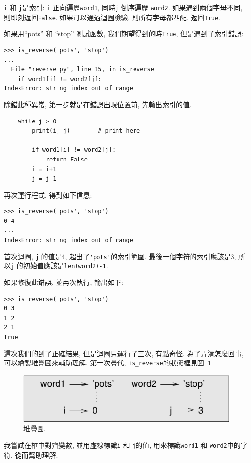 \documentclass[10pt]{book}
\begin{document}
{\tt i} 和 {\tt j}是索引: {\tt i} 正向遍歷{\tt word1}, 同時{\tt j} 倒序遍歷
{\tt word2}. 如果遇到兩個字母不同, 則即刻返回{\tt False}. 
如果可以通過迴圈檢驗, 則所有字母都匹配, 返回{\tt True}. 

如果用``pots'' 和 ``stop'' 測試函數, 我們期望得到的時{\tt True}, 
但是遇到了索引錯誤:

\begin{verbatim}
>>> is_reverse('pots', 'stop')
...
  File "reverse.py", line 15, in is_reverse
    if word1[i] != word2[j]:
IndexError: string index out of range
\end{verbatim}
%
除錯此種異常, 第一步就是在錯誤出現位置前, 先輸出索引的值. 

\begin{verbatim}
    while j > 0:
        print(i, j)        # print here
        
        if word1[i] != word2[j]:
            return False
        i = i+1
        j = j-1
\end{verbatim}
%
再次運行程式, 得到如下信息:

\begin{verbatim}
>>> is_reverse('pots', 'stop')
0 4
...
IndexError: string index out of range
\end{verbatim}
%
首次迴圈,  {\tt j} 的值是4,
超出了\verb"'pots'"的索引範圍. 
最後一個字符的索引應該是3,
所以{\tt j} 的初始值應該是{\tt len(word2)-1}.

如果修復此錯誤, 並再次執行, 輸出如下:

\begin{verbatim}
>>> is_reverse('pots', 'stop')
0 3
1 2
2 1
True
\end{verbatim}
%
這次我們的到了正確結果, 但是迴圈只運行了三次, 有點奇怪. 
為了弄清怎麼回事, 可以繪製堆疊圖來輔助理解. 
第一次疊代, \verb"is_reverse"的狀態框見圖~\ref{fig.state4}.  
 

\begin{figure}
\centerline
{\includegraphics[scale=0.8]{figs/state4.pdf}}
\caption{堆疊圖.}
\label{fig.state4}
\end{figure}

我嘗試在框中對齊變數, 並用虛線標識{\tt i} 和
{\tt j}的值, 用來標識{\tt word1} 和 {\tt word2}中的字符, 
從而幫助理解. 
\end{document}
